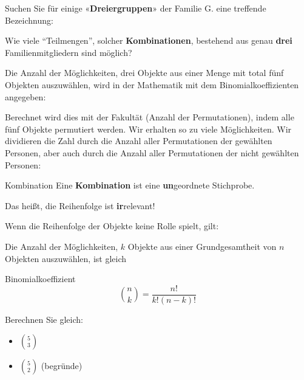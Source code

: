 Suchen Sie für einige «\textbf{Dreiergruppen}» der Familie G. eine treffende Bezeichnung:

\clearpage
\ClearShipoutPicture


Wie viele ``Teilmengen'', solcher \textbf{Kombinationen}, bestehend aus genau \textbf{drei} Familienmitgliedern sind möglich?



Die Anzahl der Möglichkeiten, drei Objekte aus einer Menge mit total
fünf Objekten auszuwählen, wird in der Mathematik mit dem
Binomialkoeffizienten angegeben:


Berechnet wird dies mit der Fakultät (Anzahl der Permutationen), indem
alle fünf Objekte permutiert werden. Wir erhalten so zu viele
Möglichkeiten. Wir dividieren die Zahl durch die Anzahl aller Permutationen der
gewählten Personen, aber auch durch die Anzahl aller Permutationen der
nicht gewählten Personen:


\begin{definition}{Kombination}{}
  Eine \textbf{Kombination} ist eine \textbf{un}geordnete Stichprobe.

  Das heißt, die Reihenfolge ist \textbf{ir}relevant!
\end{definition}

Wenn die Reihenfolge der Objekte keine Rolle spielt, gilt:

Die Anzahl der Möglichkeiten, $k$ Objekte aus einer Grundgesamtheit
von $n$ Objekten auszuwählen, ist gleich

\begin{definition}{Binomialkoeffizient}{}
$${n\choose k} = \frac{n!}{k!(n-k)!}$$
\end{definition}

Berechnen Sie gleich:
\begin{itemize}
\item $5\choose 3$
\item $5\choose 2$ (begründe) 
\end{itemize}


